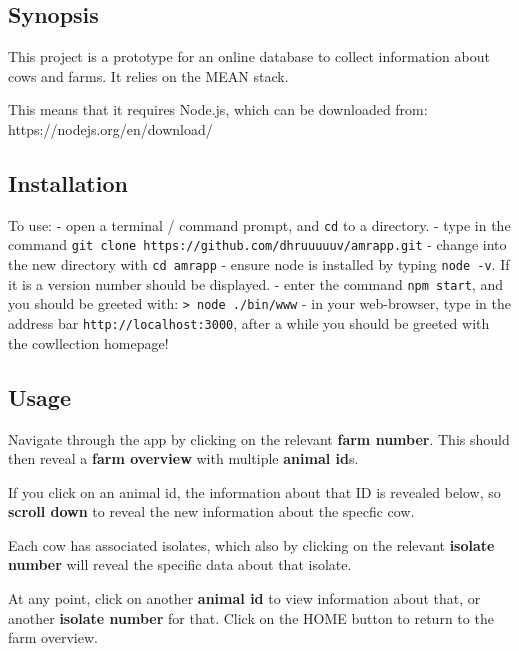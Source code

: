 \documentclass[]{article}
\date{}
\begin{document}
\subsection{Synopsis}\label{synopsis}

This project is a prototype for an online database to collect
information about cows and farms. It relies on the MEAN stack.

This means that it requires Node.js, which can be downloaded from:
https://nodejs.org/en/download/

\subsection{Installation}\label{installation}

To use: - open a terminal / command prompt, and \texttt{cd} to a
directory. - type in the command
\texttt{git\ clone\ https://github.com/dhruuuuuv/amrapp.git} - change
into the new directory with \texttt{cd\ amrapp} - ensure node is
installed by typing \texttt{node\ -v}. If it is a version number should
be displayed. - enter the command \texttt{npm\ start}, and you should be
greeted with: \texttt{\textgreater{}\ node\ ./bin/www} - in your
web-browser, type in the address bar \texttt{http://localhost:3000},
after a while you should be greeted with the cowllection homepage!

\subsection{Usage}\label{usage}

Navigate through the app by clicking on the relevant \textbf{farm
number}. This should then reveal a \textbf{farm overview} with multiple
\textbf{animal id}s.

If you click on an animal id, the information about that ID is revealed
below, so \textbf{scroll down} to reveal the new information about the
specfic cow.

Each cow has associated isolates, which also by clicking on the relevant
\textbf{isolate number} will reveal the specific data about that
isolate.

At any point, click on another \textbf{animal id} to view information
about that, or another \textbf{isolate number} for that. Click on the
HOME button to return to the farm overview.
\end{document}
